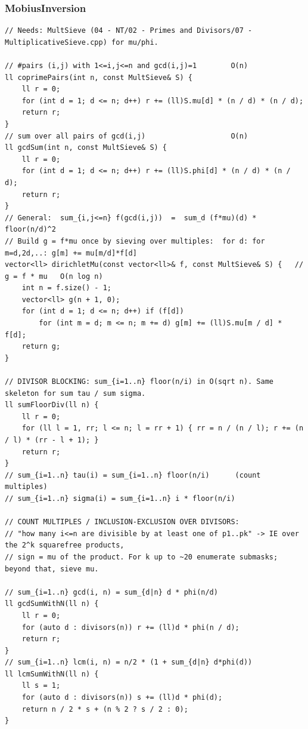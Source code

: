 \documentclass[9pt,a4paper,twocolumn]{extarticle}
\begin{document}
\subsubsection{MobiusInversion}
\nopagebreak
\begin{lstlisting}
// Needs: MultSieve (04 - NT/02 - Primes and Divisors/07 - MultiplicativeSieve.cpp) for mu/phi.

// #pairs (i,j) with 1<=i,j<=n and gcd(i,j)=1        O(n)
ll coprimePairs(int n, const MultSieve& S) {
    ll r = 0;
    for (int d = 1; d <= n; d++) r += (ll)S.mu[d] * (n / d) * (n / d);
    return r;
}
// sum over all pairs of gcd(i,j)                    O(n)
ll gcdSum(int n, const MultSieve& S) {
    ll r = 0;
    for (int d = 1; d <= n; d++) r += (ll)S.phi[d] * (n / d) * (n / d);
    return r;
}
// General:  sum_{i,j<=n} f(gcd(i,j))  =  sum_d (f*mu)(d) * floor(n/d)^2
// Build g = f*mu once by sieving over multiples:  for d: for m=d,2d,..: g[m] += mu[m/d]*f[d]
vector<ll> dirichletMu(const vector<ll>& f, const MultSieve& S) {   // g = f * mu   O(n log n)
    int n = f.size() - 1;
    vector<ll> g(n + 1, 0);
    for (int d = 1; d <= n; d++) if (f[d])
        for (int m = d; m <= n; m += d) g[m] += (ll)S.mu[m / d] * f[d];
    return g;
}

// DIVISOR BLOCKING: sum_{i=1..n} floor(n/i) in O(sqrt n). Same skeleton for sum tau / sum sigma.
ll sumFloorDiv(ll n) {
    ll r = 0;
    for (ll l = 1, rr; l <= n; l = rr + 1) { rr = n / (n / l); r += (n / l) * (rr - l + 1); }
    return r;
}
// sum_{i=1..n} tau(i) = sum_{i=1..n} floor(n/i)      (count multiples)
// sum_{i=1..n} sigma(i) = sum_{i=1..n} i * floor(n/i)

// COUNT MULTIPLES / INCLUSION-EXCLUSION OVER DIVISORS:
// "how many i<=n are divisible by at least one of p1..pk" -> IE over the 2^k squarefree products,
// sign = mu of the product. For k up to ~20 enumerate submasks; beyond that, sieve mu.

// sum_{i=1..n} gcd(i, n) = sum_{d|n} d * phi(n/d)
ll gcdSumWithN(ll n) {
    ll r = 0;
    for (auto d : divisors(n)) r += (ll)d * phi(n / d);
    return r;
}
// sum_{i=1..n} lcm(i, n) = n/2 * (1 + sum_{d|n} d*phi(d))
ll lcmSumWithN(ll n) {
    ll s = 1;
    for (auto d : divisors(n)) s += (ll)d * phi(d);
    return n / 2 * s + (n % 2 ? s / 2 : 0);
}
\end{lstlisting}
\end{document}
